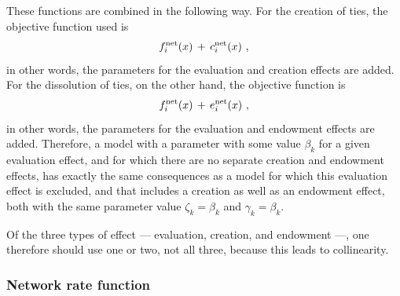 \documentclass[a4paper,fleqn,11pt]{article}
\newcommand{\+}{\, + \,}
\begin{document}
These functions are combined in the following way.
For the creation of ties, the objective function used is
\begin{equation}
f_i^{\rm net}(x) \,+\, c_i^{\rm net}(x)     \ ,             \label{fc_net}
\end{equation}
in other words, the parameters for the evaluation and creation effects are
added.
For the dissolution of ties, on the other hand, the objective function is
\begin{equation}
f_i^{\rm net}(x) \,+\, e_i^{\rm net}(x)      \ ,            \label{fe_net}
\end{equation}
in other words, the parameters for the evaluation and endowment effects are
added.
Therefore, a model with a parameter with some value $\beta_k$
for a given evaluation effect,
and for which there are no separate creation and endowment effects,
has exactly the same consequences as a model for which this
evaluation effect is excluded, and that includes a creation as well as
an endowment effect, both with the same parameter value
$\zeta_k = \beta_k$ and $\gamma_k = \beta_k$.

Of the three types of effect --- evaluation, creation, and endowment ---,
one therefore should use one or two, not all three, because this leads to collinearity.


\subsubsection{Network rate function} \label{S_r}
\end{document}
